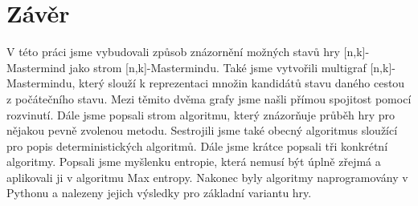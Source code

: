 \chapter*{Závěr}

V této práci jsme vybudovali způsob znázornění možných stavů hry [n,k]-Mastermind jako strom [n,k]-Mastermindu. Také jsme vytvořili multigraf [n,k]-Mastermindu, který slouží k reprezentaci množin kandidátů stavu daného cestou z počátečního stavu. Mezi těmito dvěma grafy jsme našli přímou spojitost pomocí rozvinutí. Dále jsme popsali strom algoritmu, který znázorňuje průběh hry pro nějakou pevně zvolenou metodu. Sestrojili jsme také obecný algoritmus sloužící pro popis deterministických algoritmů. Dále jsme krátce popsali tři konkrétní algoritmy. Popsali jsme myšlenku entropie, která nemusí být úplně zřejmá a aplikovali ji v algoritmu Max entropy. Nakonec byly algoritmy naprogramovány v Pythonu a nalezeny jejich výsledky pro základní variantu hry. 



